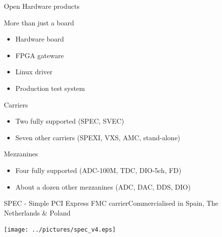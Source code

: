 \documentclass[compress,red]{beamer}
\begin{document}
\begin{frame}{Open Hardware products}

  \begin{block}{More than just a board}
    \begin{itemize}
    \item Hardware board
    \item FPGA gateware
    \item Linux driver
    \item Production test system
    \end{itemize}
  \end{block}

  \begin{block}{Carriers}
    \begin{itemize}
    \item Two fully supported (SPEC, SVEC)
    \item Seven other carriers (SPEXI, VXS, AMC, stand-alone)
    \end{itemize}
  \end{block}


  \begin{block}{Mezzanines}
    \begin{itemize}
    \item Four fully supported (ADC-100M, TDC, DIO-5ch, FD)
    \item About a dozen other mezzanines (ADC, DAC, DDS, DIO)
    \end{itemize}
  \end{block}


  \note[item]{}

\end{frame}

\begin{frame}{SPEC - Simple PCI Express FMC carrier}{Commercialised in Spain, The Netherlands \& Poland}

  \begin{center}
    \texttt{[image: ../pictures/spec\_v4.eps]}
  \end{center}

  \note[item]{}

\end{frame}
\end{document}
